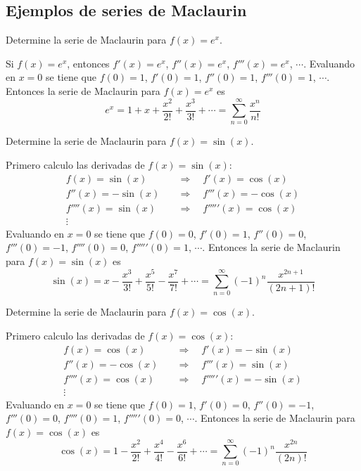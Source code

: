 \documentclass{article}
\begin{document}
\subsection{Ejemplos de series de Maclaurin}

\begin{example}{1}
    Determine la serie de Maclaurin para $f(x) = e^x$.
\end{example}

Si $f(x) = e^x$, entonces $f'(x) = e^x$, $f''(x) = e^x$, $f'''(x) = e^x$, $\cdots$. Evaluando en $x=0$ se tiene que $f(0) = 1$, $f'(0) = 1$, $f''(0) = 1$, $f'''(0) = 1$, $\cdots$. Entonces la serie de Maclaurin para $f(x) = e^x$ es
\begin{equation*}
    e^x = 1 + x + \frac{x^2}{2!} + \frac{x^3}{3!} + \cdots = \sum_{n=0}^{\infty} \frac{x^n}{n!}
\end{equation*}

\newpage
\begin{example}{2}
    Determine la serie de Maclaurin para $f(x) = \sin(x)$.
\end{example}
Primero calculo las derivadas de $f(x) = \sin(x)$:
\begin{align*}
    f(x) = \sin(x) \quad &\Rightarrow \quad f'(x) = \cos(x) \\
    f''(x) = -\sin(x) \quad &\Rightarrow \quad f'''(x) = -\cos(x) \\
    f''''(x) = \sin(x) \quad &\Rightarrow \quad f'''''(x) = \cos(x) \\
    \vdots
\end{align*}
Evaluando en $x=0$ se tiene que $f(0) = 0$, $f'(0) = 1$, $f''(0) = 0$, $f'''(0) = -1$, $f''''(0) = 0$, $f'''''(0) = 1$, $\cdots$. Entonces la serie de Maclaurin para $f(x) = \sin(x)$ es
\begin{equation*}
    \sin(x) = x - \frac{x^3}{3!} + \frac{x^5}{5!} - \frac{x^7}{7!} + \cdots = \sum_{n=0}^{\infty} (-1)^n \frac{x^{2n+1}}{(2n+1)!}
\end{equation*}

\begin{example}{3}
    Determine la serie de Maclaurin para $f(x) = \cos(x)$.
\end{example}
Primero calculo las derivadas de $f(x) = \cos(x)$:
\begin{align*}
    f(x) = \cos(x) \quad &\Rightarrow \quad f'(x) = -\sin(x) \\
    f''(x) = -\cos(x) \quad &\Rightarrow \quad f'''(x) = \sin(x) \\
    f''''(x) = \cos(x) \quad &\Rightarrow \quad f'''''(x) = -\sin(x) \\
    \vdots
\end{align*}
Evaluando en $x=0$ se tiene que $f(0) = 1$, $f'(0) = 0$, $f''(0) = -1$, $f'''(0) = 0$, $f''''(0) = 1$, $f'''''(0) = 0$, $\cdots$. Entonces la serie de Maclaurin para $f(x) = \cos(x)$ es
\begin{equation*}
    \cos(x) = 1 - \frac{x^2}{2!} + \frac{x^4}{4!} - \frac{x^6}{6!} + \cdots = \sum_{n=0}^{\infty} (-1)^n \frac{x^{2n}}{(2n)!}
\end{equation*}
\end{document}
